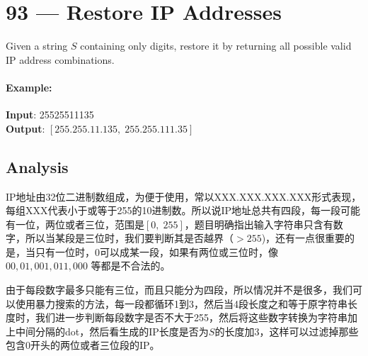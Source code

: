 \section{93 --- Restore IP Addresses}
Given a string $S$ containing only digits, restore it by returning all possible valid IP address combinations.
\paragraph{Example:}
\begin{flushleft}
\textbf{Input}: 25525511135
\\
\textbf{Output}: $[255.255.11.135,\;255.255.111.35]$
\end{flushleft}
\subsection{Analysis}
IP地址由32位二进制数组成，为便于使用，常以XXX.XXX.XXX.XXX形式表现，每组XXX代表小于或等于255的10进制数。所以说IP地址总共有四段，每一段可能有一位，两位或者三位，范围是$[0,\;255]$，题目明确指出输入字符串只含有数字，所以当某段是三位时，我们要判断其是否越界（$>255$)，还有一点很重要的是，当只有一位时，0可以成某一段，如果有两位或三位时，像 $00, 01, 001, 011, 000$ 等都是不合法的。
\par
由于每段数字最多只能有三位，而且只能分为四段，所以情况并不是很多，我们可以使用暴力搜索的方法，每一段都循环1到3，然后当4段长度之和等于原字符串长度时，我们进一步判断每段数字是否不大于255，然后将这些数字转换为字符串加上中间分隔的dot，然后看生成的IP长度是否为$S$的长度加3，这样可以过滤掉那些包含0开头的两位或者三位段的IP。
